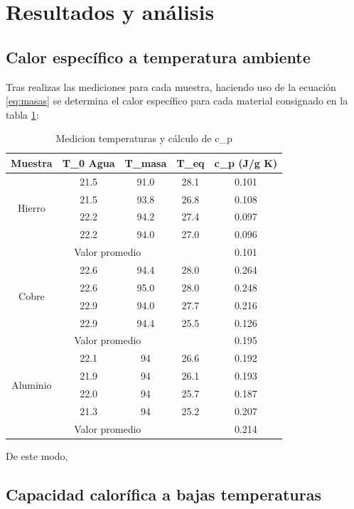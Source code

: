 \section{Resultados y análisis}
\subsection{Calor específico a temperatura ambiente}
Tras realizas las mediciones para cada muestra, haciendo uso de la ecuación \ref{eq:masas} se determina el calor específico para cada material consignado en la tabla \ref{tab:cp}:

\begin{table}[H]
    \centering
    \begin{tabular}{|c|c|c|c|c|}
    \hline
        Muestra&T_0 Agua &T_{masa} &T_{eq} &c_{p} (J/g K) \\\hline
        \multirow{4}{*}{Hierro}&21.5 &91.0 &28.1  &0.101 \\
        &21.5 &93.8 &26.8&0.108  \\
        & 22.2& 94.2&  27.4&0.097 \\
        & 22.2& 94.0&  27.0&0.096 \\\hline
        \multicolumn{4}{|c|}{Valor promedio}&0.101\\\hline
        \multirow{4}{*}{Cobre}&22.6 &94.4 &28.0 &0.264  \\
        &22.6 &95.0 &28.0 &0.248 \\
        & 22.9& 94.0&27.7 & 0.216\\
        &22.9 & 94.4& 25.5&0.126 \\
        \hline
        \multicolumn{4}{|c|}{Valor promedio}&0.195\\\hline
        \multirow{4}{*}{Aluminio}&22.1 & 94&26.6 &0.192  \\
        & 21.9&94 &26.1 &0.193  \\
        & 22.0&94 &25.7 & 0.187 \\
        & 21.3& 94& 25.2& 0.207 \\
        \hline
     \multicolumn{4}{|c|}{Valor promedio}&0.214\\\hline
     
    \end{tabular}
    \caption{Medicion temperaturas y cálculo de c_{p}}
    \label{tab:cp}
\end{table}

De este modo,

\subsection{Capacidad calorífica a bajas temperaturas}

